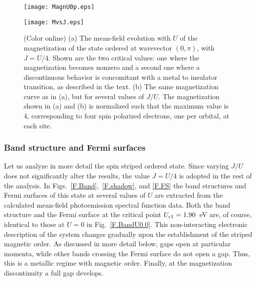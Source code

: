 \documentclass[aps,prb,superscriptaddress,preprintnumbers,
showpacs,legalpaper,twoside,twocolumn,amsmath,amssymb]{revtex4}
\begin{document}
\begin{figure}[h]
\begin{center}
\vskip -0.6cm
\centerline{\texttt{[image: MagnU0p.eps]}}
\vskip -0.7cm
\centerline{\texttt{[image: MvsJ.eps]}}
\vskip -0.5cm
\caption{(Color online) (a) The mean-field evolution with $U$ of the magnetization of
the state ordered at wavevector $(0,\pi)$, with $J=U/4$. Shown are the two critical
values: one where the magnetization becomes nonzero and a second one where a discontinuous behavior is
concomitant with a metal to insulator transition, as described in the text. (b) The same magnetization
curve as in (a), but for several values of $J/U$. The magnetization shown in (a) and (b) is normalized such that
the maximum value is 4, corresponding to four spin polarized electrons, one per orbital, at each site.}
\vskip -0.7cm
\label{F.MagMF}
\end{center}
\end{figure}



\subsubsection{Band structure and Fermi surfaces}

Let us analyze in more detail the spin striped ordered state. Since
varying $J/U$ does not significantly alter the results,
the value $J=U/4$ is adopted in
the rest of the analysis. In Figs.~\ref{F.Band},~\ref{F.shadow}, and \ref{F.FS}
the band structures and Fermi surfaces of this state
at several values of $U$ are extracted from the calculated
mean-field photoemission spectral function data. Both the band structure and
the Fermi surface at the critical point $U_{\rm c1}=1.90$~eV are, of course, identical
to those at $U=0$ in Fig.~\ref{F.BandU0.0}. This
non-interacting electronic description of the system changes gradually upon the establishment of
the striped magnetic order. As discussed in more detail below, gaps open
at particular momenta, while other bands crossing the Fermi surface do not
open a gap. Thus, this is a metallic regime with magnetic order.
Finally, at the magnetization discontinuity a full
gap develops.
\end{document}
